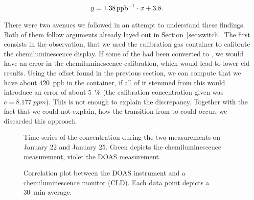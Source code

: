 \begin{align*}
  y = \SI{1.38}{{ppb}\tothe{-1}} \cdot x + 3.8.
\end{align*}

There were two avenues we followed in an attempt to understand these
findings. Both of them follow arguments already layed out in
Section~\ref{sec:switch}. The first consists in the observation, that
we used the  calibration gas container to calibrate the
chemiluminescence display. If some of the  had been converted
to , we would have an error in the chemiluminescence
calibration, which would lead to lower cld results. Using the 
offset found in the previous section, we can compute that we have
about \SI{420}{ppb}  in the container, if all of it stemmed
from  this would introduce an error of about \SI{5}{\percent}
(the calibration concentration given was $c = \SI{8.177}{ppm}$). This
is not enough to explain the discrepancy. Together with the fact that
we could not explain, how the transition from  to  could
occur, we discarded this approach.

\begin{figure}[htbp]
  \centering
  
  \hfill
  
  \caption{Time series of the  concentration during the two
    measurements on January 22 and January 25. Green depicts the
    chemiluminescence measurement, violet the DOAS measurement.}
  \label{fig:corr-ts}
\end{figure}
\begin{figure}[H]
  \centering
  
  \caption{Correlation plot between the DOAS instrument and a
    chemiluminescence monitor (CLD). Each data point depicts a
    \SI{30}{\minute} average.}
  \label{fig:cld-corr}
\end{figure}


